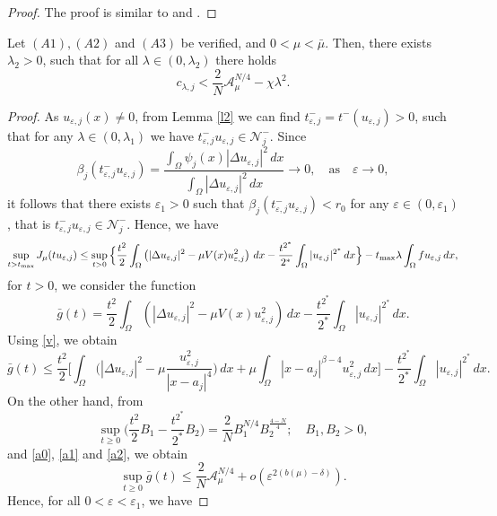 \documentclass[reqno]{amsart}
\begin{document}
 \begin{proof}
 The proof is similar to \cite{j1} and \cite{K}.
 \end{proof}
 \begin{proposition}\label{PP}
 Let $(A1), (A2)$ and $(A3)$ be verified, and \(0<\mu<\bar{\mu}\). Then, there exists \(\lambda_2>0\), such that for all \(\lambda\in(0,\lambda_2)\) there holds
\begin{equation}\label{s3}
 c_{\lambda, j}<\frac{2}{N}\mathcal{A}_{\mu}^{N/4}-\chi \lambda^2.
\end{equation}
 \end{proposition}
 \begin{proof}
 As \(u_{\varepsilon, j}(x)\neq 0\), from Lemma \ref{l2} we can find 
 \(t_{\varepsilon, j}^-=t^-(u_{\varepsilon, j})>0\), such that for any 
 \(\lambda \in (0,\lambda_1)\) we have
  \(t_{\varepsilon, j}^-u_{\varepsilon, j}\in \mathcal{N}^-_j\). Since
 \[
 \beta_{j}(t_{\varepsilon, j}^-u_{\varepsilon, j})
 =\frac{\int_{\Omega}\psi_j(x)|\Delta u_{\varepsilon, j}|^2\,dx}
 {\int_{\Omega}|\Delta u_{\varepsilon, j}|^2\,dx}\to
 0, \quad\text{as}\quad \varepsilon\to 0,
 \]
it follows that there exists \(\varepsilon_1>0\) such that 
\(\beta_{j}(t_{\varepsilon, j}^-u_{\varepsilon, j})<r_0\) for any 
\(\varepsilon \in(0,\varepsilon_1)\), that is 
\(t_{\varepsilon, j}^-u_{\varepsilon, j}\in \mathcal{N}^-_j\). Hence, we have
\[
 \sup_{t> t_{\rm max}}J_{\mu}(tu_{\varepsilon, j})\leq \sup_{t>0}
 \Big\{ \frac{t^2}{2}\int_{\Omega}\left( |\Delta u_{\varepsilon, j}
 |^2-\mu V(x)u_{\varepsilon, j}^2\right)\,dx 
 -\frac{t^{2^*}}{2^*}\int_{\Omega}|u_{\varepsilon, j}|^{2^*}\,dx \Big\} 
  -t_{\rm max}\lambda \int_{\Omega}fu_{\varepsilon, j}\,dx,
\]
 for $t>0$, we consider the function
 \[
 \bar {g}(t)=\frac{t^2}{2}\int_{\Omega}\left( |\Delta u_{\varepsilon, j}|^2
 -\mu V(x)u_{\varepsilon, j}^2\right)\,dx
 -\frac{t^{2^*}}{2^*}\int_{\Omega}|u_{\varepsilon, j}|^{2^*}\,dx.
 \]
 Using \eqref{v}, we obtain
\[
 \bar {g}(t)\leq \frac{t^2}{2}\Big[ \int_{\Omega}\Big( |\Delta u_{\varepsilon, j}|^2
 -\mu \frac{u_{\varepsilon, j}^2}{|x-a_j|^4}\Big)\,dx
 +\mu \int_{\Omega}|x-a_j|^{\beta-4}u_{\varepsilon, j}^2\,dx\Big] 
  -\frac{t^{2^*}}{2^*}\int_{\Omega}|u_{\varepsilon, j}|^{2^*}\,dx.
\]
 On the other hand, from
 \[
 \sup_{t\geq 0}\Big( \frac{t^2}{2}B_1-\frac{t^{2^*}}{2^*}B_2\Big)
  =\frac{2}{N}B_1^{N/4}B_2^{\frac{4-N}{4}}; \quad  B_1, B_2>0,
 \]
 and  \eqref{a0}, \eqref{a1} and \eqref{a2}, we obtain
 \[
 \sup_{t\geq 0}\bar {g}(t)\leq \frac{2}{N}\mathcal{A}_{\mu}^{N/4}+o(\varepsilon^{2(b(\mu)-\delta)}).
 \]
Hence, for all \(0<\varepsilon<\varepsilon_1\), we have

\end{proof}
\end{document}
